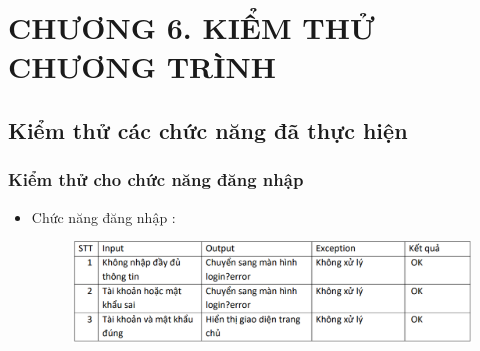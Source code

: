 \documentclass{article}
\begin{document}
\section*{CHƯƠNG 6. KIỂM THỬ CHƯƠNG TRÌNH}
\setcounter{section}{6}
\setcounter{subsection}{0}
\subsection{Kiểm thử các chức năng đã thực hiện}
\subsubsection{Kiểm thử cho chức năng đăng nhập}
\begin{itemize}
    \item Chức năng đăng nhập :
    \begin{figure}[H]
        \centering
    \includegraphics[width=1\textwidth]{Kiểm thử/Kiểm thử đăng nhập.png}
    \end{figure}
\end{itemize}
\end{document}
